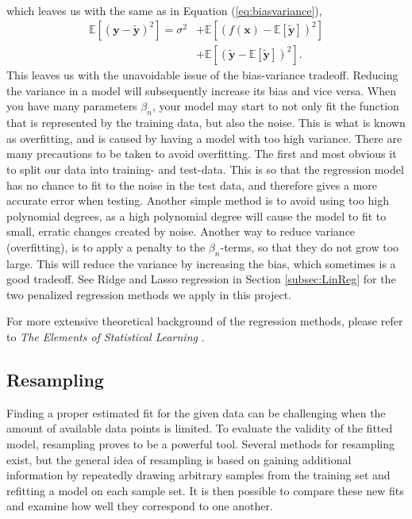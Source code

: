 \documentclass[a4paper, 10pt]{article}
\begin{document}
\begin{multicols}{2}
\begin{align*}
\end{align*}
which leaves us with the same as in Equation (\ref{eq:biasvariance}),
\begin{align}
\mathbb{E}[	(\bm{y}-\bm{\tilde{y}})^2] =  \sigma^2  &+  \mathbb{E}[( f(\bm{x}) -\mathbb{E}[\bm{\tilde{y}}]  )^2] \nonumber \\ & +\mathbb{E}[(\bm{\tilde{y}} -\mathbb{E}[\bm{\tilde{y}}])^2]. 
\end{align}
This leaves us with the unavoidable issue of the bias-variance tradeoff. Reducing the variance in a model will subsequently increase its bias and vice versa.
When you have many parameters $\beta_n$, your model may start to not only fit the function that is represented by the training data, but also the noise. This is what is known as overfitting, and is caused by having a model with too high variance. There are many precautions to be taken to avoid overfitting. The first and most obvious it to split our data into training- and test-data. This is so that the regression model has no chance to fit to the noise in the test data, and therefore gives a more accurate error when testing. Another simple method is to avoid using too high polynomial degrees, as a high polynomial degree will cause the model to fit to small, erratic changes created by noise.
Another way to reduce variance (overfitting), is to apply a penalty to the $\beta_n$-terms, so that they do not grow too large. This will reduce the variance by increasing the bias, which sometimes is a good tradeoff. See Ridge and Lasso regression in Section \ref{subsec:LinReg} for the two penalized regression methods we apply in this project.

For more extensive theoretical background of the regression methods, please refer to \textit{The Elements of Statistical Learning} \cite{hastie}.
\subsection{Resampling}
Finding a proper estimated fit for the given data can be challenging when the amount of available data points is limited. To evaluate the validity of the fitted model, resampling proves to be a powerful tool. Several methods for resampling exist, but the general idea of resampling is based on gaining additional information by repeatedly drawing arbitrary samples from the training set and refitting a model on each sample set. It is then possible to compare these new fits and examine how well they correspond to one another.


\end{multicols}
\end{document}
